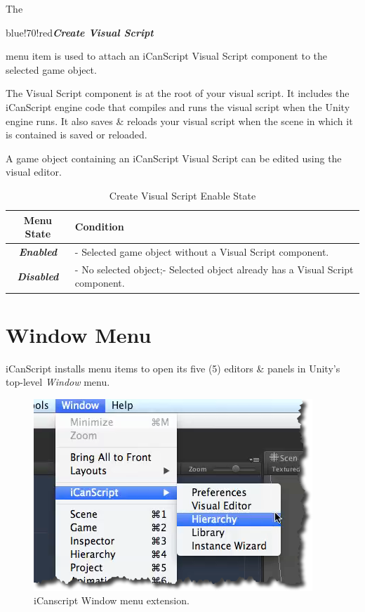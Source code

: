 The \begin{color}{blue!70!red}\emph{\textbf{Create Visual Script}}\end{color} menu item is used to attach an iCanScript Visual Script component to the selected game object.

The Visual Script component is at the root of your visual script. It includes the iCanScript engine code that compiles and runs the visual script when the Unity engine runs. It also saves \& reloads your visual script when the scene in which it is contained is saved or reloaded.

A game object containing an iCanScript Visual Script can be edited using the visual editor.

\begin{table}[htbp]
\begin{minipage}{\linewidth}
\setlength{\tymax}{0.5\linewidth}
\centering
\small
\caption{Create Visual Script Enable State}
\label{createvisualscriptenablestate}
\begin{tabulary}{\textwidth}{@{}CL@{}} \toprule
Menu State&Condition\\
\midrule
\emph{\textbf{Enabled}}&- Selected game object without a Visual Script component.\\
\emph{\textbf{Disabled}}&- No selected object;- Selected object already has a Visual Script component.\\

\bottomrule

\end{tabulary}
\end{minipage}
\end{table}

\section{Window Menu}
\label{windowmenu}

iCanScript installs menu items to open its five (5) editors \& panels in Unity's top-level \emph{Window} menu.

\begin{figure}[htbp]
\centering
\includegraphics[keepaspectratio,width=\textwidth,height=0.75\textheight]{menu-window.png}
\caption{iCanscript Window menu extension.}
\label{menu-window.png}
\end{figure}

